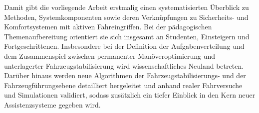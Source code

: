 Damit gibt die vorliegende Arbeit erstmalig einen systematisierten Überblick zu Methoden, Systemkomponenten sowie deren Verknüpfungen zu Sicherheits- und Komfortsystemen mit aktiven Fahreingriffen. Bei der pädagogischen Themenaufbereitung orientiert sie sich insgesamt an Studenten, Einsteigern und Fortgeschrittenen. Insbesondere bei der Definition der Aufgabenverteilung und dem Zusammenspiel zwischen permanenter Manöveroptimierung und unterlagerter Fahrzeugstabilisierung wird wissenschaftliches Neuland betreten. Darüber hinaus werden neue Algorithmen der Fahrzeugstabilisierungs- und der Fahrzeugführungsebene detailliert hergeleitet und anhand realer Fahrversuche und Simulationen validiert, sodass zusätzlich ein tiefer Einblick in den Kern neuer Assistenzsysteme gegeben wird.

\cleardoublepage






%
%
%
%
%
%



